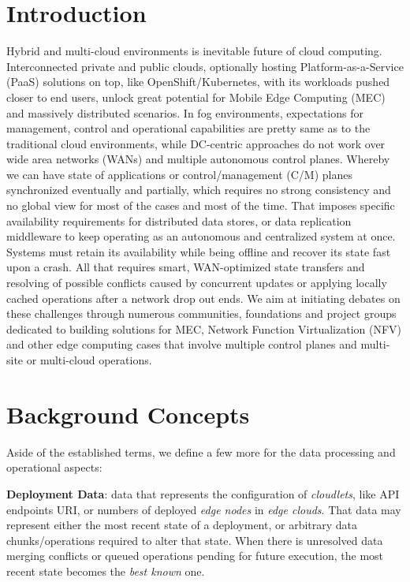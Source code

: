 \documentclass[conference]{IEEEtran}
\begin{document}
\section{Introduction}
Hybrid and multi-cloud environments is inevitable future of cloud computing.
Interconnected private and public clouds, optionally hosting
Platform-as-a-Service (PaaS) solutions on top, like OpenShift/Kubernetes, with
its workloads pushed closer to end users, unlock great potential for Mobile
Edge Computing (MEC) and massively distributed scenarios. In fog environments,
expectations for management, control and operational capabilities are pretty
same as to the traditional cloud environments, while DC-centric approaches do
not work over wide area networks (WANs) and multiple autonomous control planes.
Whereby we can have state of applications or control/management (C/M) planes
synchronized eventually and partially, which requires no strong consistency and
no global view for most of the cases and most of the time. That imposes
specific availability requirements for distributed data stores, or data
replication middleware to keep operating as an autonomous and centralized
system at once. Systems must retain its availability while being offline and
recover its state fast upon a crash. All that requires smart, WAN-optimized
state transfers and resolving of possible conflicts caused by concurrent
updates or applying locally cached operations after a network drop out ends. We
aim at initiating debates on these challenges through numerous communities,
foundations and project groups dedicated to building solutions for MEC, Network
Function Virtualization (NFV) and other edge computing cases that involve
multiple control planes and multi-site or multi-cloud operations.

\section{Background Concepts}
Aside of the established terms\cite{b3}, we define a few more for the data
processing and operational aspects:

\textbf{Deployment Data}: data that represents the configuration of
\textit{cloudlets}\cite{b3}, like API endpoints URI, or numbers of deployed
\textit{edge nodes}\cite{b3} in \textit{edge clouds}\cite{b3}. That data may
represent either the most recent state of a deployment, or arbitrary data
chunks/operations required to alter that state. When there is unresolved data
merging conflicts or queued operations pending for future execution, the most
recent state becomes the \textit{best known} one.
\end{document}
